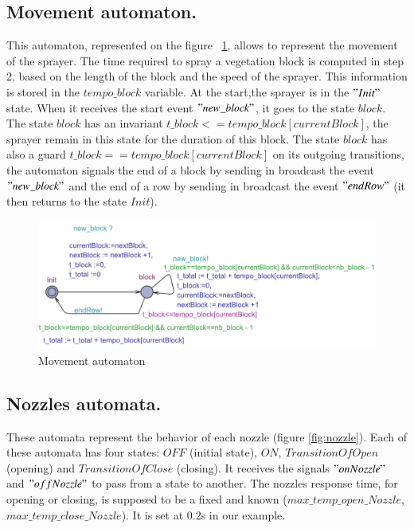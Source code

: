 \subsection{\textbf{Movement automaton.}} This automaton, represented on the figure ~\ref{fig:dep}, allows to represent the movement of the sprayer. The time required to spray a vegetation block is computed in step 2, based on the length of the block and the speed of the sprayer. This information is stored in the $ tempo\_block $ variable. At the start,the sprayer is in the $"Init"$ state. When it receives the start event $"new\_block"$, it goes to the state $ block $. The state $ block $ has an invariant $ t\_block <= tempo\_block [currentBlock] $, the sprayer remain in this state for the duration of this block. The state $ block $ has also a guard $ t\_block == tempo\_block [currentBlock ] $ on its outgoing transitions, the automaton signals the end of a block by sending in broadcast the event $"new\_block"$ and the end of a row by sending in broadcast the event $"endRow"$ (it then returns to the state $ Init $).
\begin{figure}[h!]
	\begin{center}
		\includegraphics[scale=0.6, angle =90 ]{dep.pdf}
		\caption{Movement automaton} 
		\label{fig:dep}
	\end{center}
\end{figure}

\subsection{\textbf{Nozzles automata.}} These automata represent the behavior of each nozzle (figure \ref{fig:nozzle}). Each of these automata has four states: $OFF$ (initial state), $ON$, $TransitionOfOpen$ (opening) and $TransitionOfClose$ (closing). It receives the signals $"onNozzle"$ and $"offNozzle"$ to pass from a state to another. 
The nozzles response time, for opening or closing, is supposed to be a fixed and known ($ max \_temp\_open\_Nozzle $, $ max\_temp\_close\_Nozzle $). It is set at 0.2s in our example.


